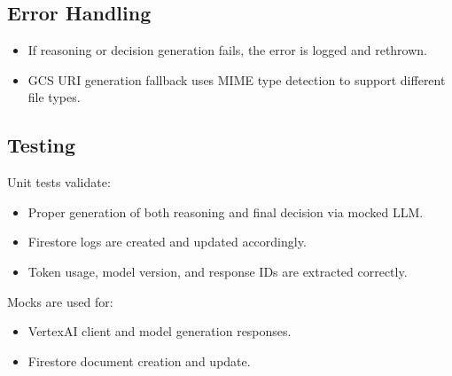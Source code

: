 \subsection*{Error Handling}

\begin{itemize}
    \item If reasoning or decision generation fails, the error is logged and rethrown.
    \item GCS URI generation fallback uses MIME type detection to support different file types.
\end{itemize}

\subsection*{Testing}

Unit tests validate:

\begin{itemize}
    \item Proper generation of both reasoning and final decision via mocked LLM.
    \item Firestore logs are created and updated accordingly.
    \item Token usage, model version, and response IDs are extracted correctly.
\end{itemize}

Mocks are used for:

\begin{itemize}
    \item VertexAI client and model generation responses.
    \item Firestore document creation and update.
\end{itemize}
